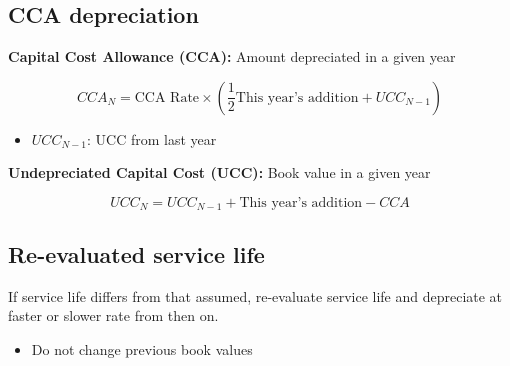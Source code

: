 \subsection{CCA depreciation}
\begin{definition}

    \textbf{Capital Cost Allowance (CCA):} Amount depreciated in a given year
        
    \begin{equation}
        CCA_N = \text{CCA Rate} \times \left(\frac{1}{2} \text{This year's addition} + UCC_{N-1}\right)    
    \end{equation} 
    
    \begin{itemize}
        \item $UCC_{N-1}$: UCC from last year
    \end{itemize}
    
    \textbf{Undepreciated Capital Cost (UCC):} Book value in a given year
    
    \begin{equation}
        UCC_N = UCC_{N-1} + \text{This year's addition} - CCA
    \end{equation}

\end{definition}

\subsection{Re-evaluated service life}
\begin{definition}
    If service life differs from that assumed, re-evaluate service life and depreciate at faster or slower rate from then on. 
    \begin{itemize}
        \item Do not change previous book values
    \end{itemize}
\end{definition}
